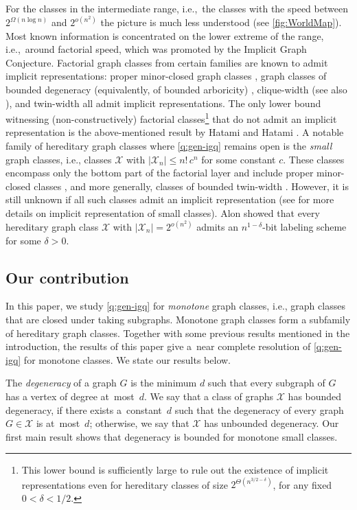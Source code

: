 \documentclass[letterpaper,11pt]{article}
\newcommand{\Xc}{\mathcal{X}}
\theoremstyle{definition}
\theoremstyle{remark}
\renewcommand{\leq}{\leqslant}
\begin{document}
	For the classes in the intermediate range, i.e.,~the classes with the speed between $2^{\Omega(n\log n)}$ and $2^{o(n^2)}$ the picture is much less understood (see \cref{fig:WorldMap}).	
	Most known information is concentrated on the lower extreme of the range, i.e.,~around factorial speed, which was promoted by the Implicit Graph Conjecture.
	Factorial graph classes from certain families are known to admit implicit representations:
 	proper minor-closed graph classes \cite{GL07}, graph classes of bounded degeneracy (equivalently, of bounded arboricity) \cite{KNR88}, clique-width \cite{CV03,Spinrad03} (see also \cite{ban22}), and twin-width \cite{BGK22} all admit implicit representations.
	The only lower bound witnessing (non-constructively) factorial classes\footnote{This lower bound is sufficiently large to rule out the existence of implicit representations even for hereditary classes of size $2^{\Theta(n^{3/2-\delta})}$, for any fixed $0<\delta<1/2$.} that do not admit an implicit representation is the above-mentioned result by Hatami and Hatami \cite{HH22}. A notable family of 
	hereditary graph classes where \cref{q:gen-igq} remains open is the \emph{small} graph classes, i.e., classes $\Xc$ with $|\Xc_n| \leq n!\,c^n$ for some constant $c$. These classes encompass only the bottom part of the factorial layer
	and include proper minor-closed classes \cite{BlankenshipThesis,NSTW06}, and more generally, classes of bounded twin-width \cite{BGK22}. However, it is still  unknown if all such classes admit an implicit representation (see \cite{BDSZZ23} for more details on implicit representation of small classes).
	Alon showed \cite{Alon23} that every hereditary graph class $\Xc$ with $|\Xc_n| = 2^{o(n^2)}$ admits an $n^{1-\delta}$-bit labeling scheme for some $\delta > 0$.



\subsection{Our contribution} In this paper, we study \cref{q:gen-igq} for \emph{monotone} graph classes, i.e., graph classes that are closed under taking subgraphs. Monotone graph classes form a subfamily of hereditary graph classes. Together with some previous results mentioned in the introduction, the results of this paper give a~near complete resolution of \cref{q:gen-igq} for monotone classes. We state our results below.


	The \emph{degeneracy} of a graph $G$ is the minimum $d$ such that every subgraph of $G$
        has a vertex of degree at~most~$d$.
        We say that a class of graphs $\Xc$ has bounded 
        degeneracy, if there exists a~constant~$d$ such that the degeneracy of every graph $G \in \Xc$ is at~most~$d$; otherwise, we say that $\Xc$ has unbounded degeneracy.
        Our first main result shows that degeneracy is bounded for monotone small classes.  	
\end{document}
